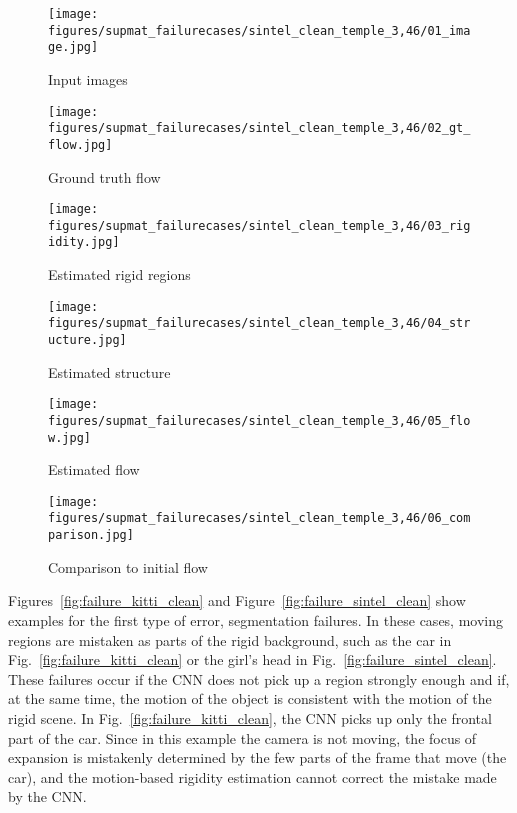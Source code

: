 \documentclass[10pt,twocolumn,letterpaper]{article}
\begin{document}
\begin{figure*}[ht!]
\captionsetup{justification=centering}
\centering
\begin{subfigure}[t]{\failurewidth}
	\texttt{[image: figures/supmat\_failurecases/sintel\_clean\_temple\_3,46/01\_image.jpg]}
	\caption{Input images}
\end{subfigure}\begin{subfigure}[t]{\failurewidth}
	\texttt{[image: figures/supmat\_failurecases/sintel\_clean\_temple\_3,46/02\_gt\_flow.jpg]}
	\caption{Ground truth flow}
\end{subfigure}\begin{subfigure}[t]{\failurewidth}
	\texttt{[image: figures/supmat\_failurecases/sintel\_clean\_temple\_3,46/03\_rigidity.jpg]}
	\caption{Estimated rigid regions}
\end{subfigure}
\begin{subfigure}[t]{\failurewidth}
	\texttt{[image: figures/supmat\_failurecases/sintel\_clean\_temple\_3,46/04\_structure.jpg]}
	\caption{Estimated structure}
\end{subfigure}\begin{subfigure}[t]{\failurewidth}
	\texttt{[image: figures/supmat\_failurecases/sintel\_clean\_temple\_3,46/05\_flow.jpg]}
	\caption{Estimated flow}
\end{subfigure}\begin{subfigure}[t]{\failurewidth}
	\texttt{[image: figures/supmat\_failurecases/sintel\_clean\_temple\_3,46/06\_comparison.jpg]}
	\caption{Comparison to initial flow}
\end{subfigure}
\caption{Failure case Sintel clean: Moving regions are wrongly detected as rigid. \\EPE initialization: . EPE MR-Flow: .}
\label{fig:failure_sintel_clean}
\end{figure*}

Figures~\ref{fig:failure_kitti_clean} and Figure~\ref{fig:failure_sintel_clean} show examples for the first type of error, segmentation failures.
In these cases, moving regions are mistaken as parts of the rigid background, such as the car in Fig.~\ref{fig:failure_kitti_clean} or the girl's head in Fig.~\ref{fig:failure_sintel_clean}.
These failures occur if the CNN does not pick up a region strongly enough and if, at the same time, the motion of the object is consistent with the motion of the rigid scene.
In Fig.~\ref{fig:failure_kitti_clean}, the CNN picks up only the frontal part of the car.
Since in this example the camera is not moving, the focus of expansion is mistakenly determined by the few parts of the frame that move (\ie the car), and the motion-based rigidity estimation cannot correct the mistake made by the CNN.
\end{document}
